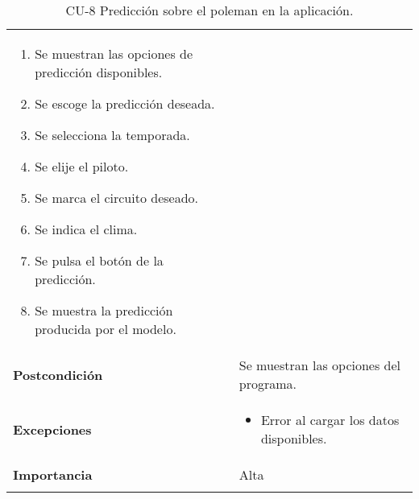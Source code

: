 \begin{longtable}[h!]{@{}ll@{}}
\begin{minipage}[t]{0.71\columnwidth}
\begin{enumerate}
\def\labelenumi{\arabic{enumi}.}
\tightlist
\item
  Se muestran las opciones de predicción disponibles.
\item
  Se escoge la predicción deseada.
\item
  Se selecciona la temporada.
\item
  Se elije el piloto.
\item
  Se marca el circuito deseado.
\item
  Se indica el clima.
\item
  Se pulsa el botón de la predicción.
\item
  Se muestra la predicción producida por el modelo.
\end{enumerate}\strut
\end{minipage}\tabularnewline
\begin{minipage}[t]{0.23\columnwidth}\raggedright\strut
\textbf{Postcondición}\strut
\end{minipage} & \begin{minipage}[t]{0.71\columnwidth}\raggedright\strut
Se muestran las opciones del programa.\strut
\end{minipage}\tabularnewline
\begin{minipage}[t]{0.23\columnwidth}\raggedright\strut
\textbf{Excepciones}\strut
\end{minipage} & \begin{minipage}[t]{0.71\columnwidth}\raggedright\strut
\begin{itemize}
\tightlist
\item
  Error al cargar los datos disponibles.
\end{itemize}\strut
\end{minipage}\tabularnewline
\begin{minipage}[t]{0.23\columnwidth}\raggedright\strut
\textbf{Importancia}\strut
\end{minipage} & \begin{minipage}[t]{0.71\columnwidth}\raggedright\strut
Alta\strut
\end{minipage}\tabularnewline
\bottomrule
\caption{CU-8 Predicción sobre el poleman en la aplicación.}
\end{longtable}